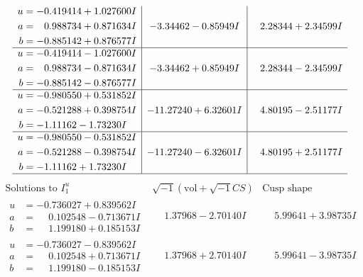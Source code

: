 \documentclass[1p]{elsarticle_modified}
\theoremstyle{definition}
\newcommand{\I}{\sqrt{-1}}
\begin{document}
$$\begin{array}{c|c|c}
\begin{aligned}
u &= -0.419414 + 1.027600 I \\
a &= \phantom{-}0.988734 + 0.871634 I \\
b &= -0.885142 + 0.876577 I\end{aligned}
 & -3.34462 - 0.85949 I & \phantom{-}2.28344 + 2.34599 I \\ \hline\begin{aligned}
u &= -0.419414 - 1.027600 I \\
a &= \phantom{-}0.988734 - 0.871634 I \\
b &= -0.885142 - 0.876577 I\end{aligned}
 & -3.34462 + 0.85949 I & \phantom{-}2.28344 - 2.34599 I \\ \hline\begin{aligned}
u &= -0.980550 + 0.531852 I \\
a &= -0.521288 + 0.398754 I \\
b &= -1.11162 - 1.73230 I\end{aligned}
 & -11.27240 + 6.32601 I & \phantom{-}4.80195 - 2.51177 I \\ \hline\begin{aligned}
u &= -0.980550 - 0.531852 I \\
a &= -0.521288 - 0.398754 I \\
b &= -1.11162 + 1.73230 I\end{aligned}
 & -11.27240 - 6.32601 I & \phantom{-}4.80195 + 2.51177 I\\
 \hline 
 \end{array}$$\newpage$$\begin{array}{c|c|c}  
\text{Solutions to }I^u_{1}& \I (\text{vol} + \sqrt{-1}CS) & \text{Cusp shape}\\
 \hline 
\begin{aligned}
u &= -0.736027 + 0.839562 I \\
a &= \phantom{-}0.102548 - 0.713671 I \\
b &= \phantom{-}1.199180 + 0.185153 I\end{aligned}
 & \phantom{-}1.37968 - 2.70140 I & \phantom{-}5.99641 + 3.98735 I \\ \hline\begin{aligned}
u &= -0.736027 - 0.839562 I \\
a &= \phantom{-}0.102548 + 0.713671 I \\
b &= \phantom{-}1.199180 - 0.185153 I\end{aligned}
 & \phantom{-}1.37968 + 2.70140 I & \phantom{-}5.99641 - 3.98735 I \\ \hline\begin{aligned}

\end{aligned}
\end{array}$$
\end{document}
